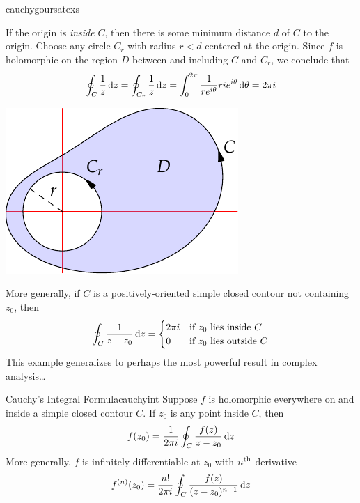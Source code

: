 \begin{examples}{}{cauchygoursatexs}
\begin{enumerate}
\begin{itemize}
	  	\begin{minipage}[t]{0.6\linewidth}\vspace{0pt}
	    	\item If the origin is \emph{inside}  $C$, then there is some minimum distance $d$ of $C$ to the origin. Choose any circle $C_r$ with radius $r<d$ centered at the origin. Since $f$ is holomorphic on the region $D$ between and including $C$ and $C_r$, we conclude that
				\[
					\oint_C\frac 1z\,{\mathrm{d} z}=\oint_{C_r}\frac 1z\,{\mathrm{d} z} =\int_0^{2\pi}\frac 1{re^{i\theta}}ri e^{i\theta}\,{\mathrm{d}\theta}=2\pi i
				\]
	  	\end{minipage}
	  	\hfill
	  	\begin{minipage}[t]{0.39\linewidth}\vspace{0pt}
	  		\flushright\includegraphics[scale=0.95]{cauchygoursat}
	  	\end{minipage}
  	\end{itemize}

  	More generally, if $C$ is a positively-oriented simple closed contour not containing $z_0$, then
  	\[
  		\oint_C\frac 1{z-z_0}\,{\mathrm{d} z}=
  		\begin{cases}
  			2\pi i&\text{if $z_0$ lies inside $C$}\\
  			0&\text{if $z_0$ lies outside $C$}
  		\end{cases}
  	\]
  	This example generalizes to perhaps the most powerful result in complex analysis\ldots
	\end{enumerate}
\end{examples}


\goodbreak



\begin{thm}{Cauchy's Integral Formula}{cauchyint}
	Suppose $f$ is holomorphic everywhere on and inside a simple closed contour $C$. If $z_0$ is any point inside $C$, then
	\[
		f(z_0)=\frac 1{2\pi i}\oint_C\frac{f(z)}{z-z_0}\,{\mathrm{d} z}
	\]
	More generally, $f$ is infinitely differentiable at $z_0$ with $n\textsuperscript{th}$ derivative
	\[
		f^{(n)}(z_0)=\frac{n!}{2\pi i}\oint_C\frac{f(z)}{(z-z_0)^{n+1}}\,{\mathrm{d} z}
	\]
\end{thm}

